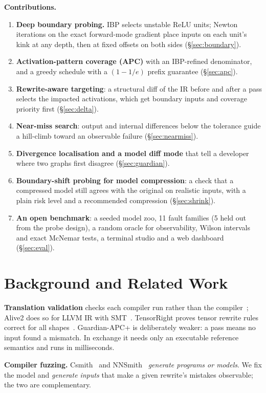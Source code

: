 \documentclass[conference]{IEEEtran}
\begin{document}
\textbf{Contributions.}
\begin{enumerate}
\item \textbf{Deep boundary probing.} IBP selects unstable ReLU units; Newton iterations on the exact forward-mode gradient place inputs on each unit's kink at any depth, then at fixed offsets on both sides (\S\ref{sec:boundary}).
\item \textbf{Activation-pattern coverage (APC)} with an IBP-refined denominator, and a greedy schedule with a $(1-1/e)$ prefix guarantee (\S\ref{sec:apc}).
\item \textbf{Rewrite-aware targeting}: a structural diff of the IR before and after a pass selects the impacted activations, which get boundary inputs and coverage priority first (\S\ref{sec:delta}).
\item \textbf{Near-miss search}: output and internal differences below the tolerance guide a hill-climb toward an observable failure (\S\ref{sec:nearmiss}).
\item \textbf{Divergence localisation and a model diff mode} that tell a developer where two graphs first disagree (\S\ref{sec:guardian}).
\item \textbf{Boundary-shift probing for model compression}: a check that a compressed model still agrees with the original on realistic inputs, with a plain risk level and a recommended compression (\S\ref{sec:shrink}).
\item \textbf{An open benchmark}: a seeded model zoo, 11 fault families (5 held out from the probe design), a random oracle for observability, Wilson intervals and exact McNemar tests, a terminal studio and a web dashboard (\S\ref{sec:eval}).
\end{enumerate}

\section{Background and Related Work}
\textbf{Translation validation} checks each compiler run rather than the compiler~\cite{pnueli,necula}; Alive2 does so for LLVM IR with SMT~\cite{alive2}. TensorRight proves tensor rewrite rules correct for all shapes~\cite{tensorright}. Guardian-APC+ is deliberately weaker: a pass means no input found a mismatch. In exchange it needs only an executable reference semantics and runs in milliseconds.

\textbf{Compiler fuzzing.} Csmith~\cite{csmith} and NNSmith~\cite{nnsmith} \emph{generate programs or models}. We fix the model and \emph{generate inputs} that make a given rewrite's mistakes observable; the two are complementary.
\end{document}
